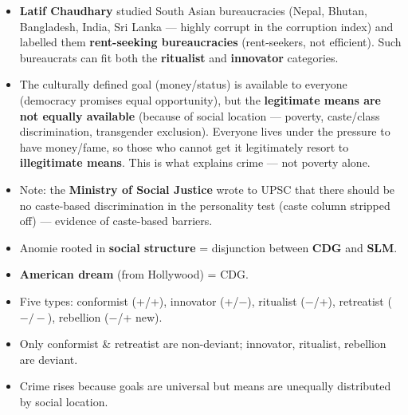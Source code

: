 \begin{DataFact}
\begin{itemize}
\item \textbf{Latif Chaudhary} studied South Asian bureaucracies (Nepal, Bhutan, Bangladesh, India, Sri Lanka --- highly corrupt in the corruption index) and labelled them \textbf{rent-seeking bureaucracies} (rent-seekers, not efficient). Such bureaucrats can fit both the \textbf{ritualist} and \textbf{innovator} categories.
\end{itemize}
\end{DataFact}

\begin{KeyConcept}
\begin{itemize}
\item The culturally defined goal (money/status) is available to everyone (democracy promises equal opportunity), but the \textbf{legitimate means are not equally available} (because of social location --- poverty, caste/class discrimination, transgender exclusion). Everyone lives under the pressure to have money/fame, so those who cannot get it legitimately resort to \textbf{illegitimate means}. This is what explains crime --- not poverty alone.
\item Note: the \textbf{Ministry of Social Justice} wrote to UPSC that there should be no caste-based discrimination in the personality test (caste column stripped off) --- evidence of caste-based barriers.
\end{itemize}
\end{KeyConcept}

\begin{QuickRevision}
\begin{itemize}
\item Anomie rooted in \textbf{social structure} = disjunction between \textbf{CDG} and \textbf{SLM}.
\item \textbf{American dream} (from Hollywood) = CDG.
\item Five types: conformist (+/+), innovator (+/$-$), ritualist ($-$/+), retreatist ($-/-$), rebellion ($-$/+ new).
\item Only conformist \& retreatist are non-deviant; innovator, ritualist, rebellion are deviant.
\item Crime rises because goals are universal but means are unequally distributed by social location.
\end{itemize}
\end{QuickRevision}

\sectiondivider

